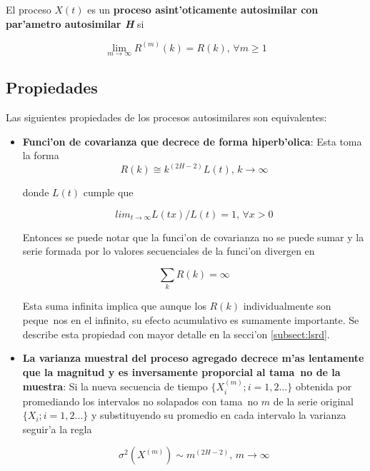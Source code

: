 \begin{definicion} \label{def:aso-autosimilar}
El proceso $X(t)$ es un {\bf proceso asint'oticamente autosimilar con 
par'ametro autosimilar {\it H}} si

\begin{equation} \label{eq:aso-autosimilar}
\lim_{m \to \infty} R^{(m)}(k) = R(k) \text{,  } \forall m \geq 1
\end{equation}
\end{definicion}

\subsection{Propiedades}

Las siguientes propiedades de los procesos autosimilares son equivalentes:

\begin{itemize}
\item {\bf Funci'on de covarianza que decrece de forma hiperb'olica}: Esta toma la forma
\begin{equation}
R(k) \cong k^{(2H-2)}L(t) \text{,  } k \to \infty
\end{equation}

donde $L(t)$ cumple que

\begin{equation}
lim_{t \to \infty} L(tx)/L(t) = 1 \text{,  } \forall x > 0
\end{equation}

Entonces se puede notar que la funci'on de covarianza no se puede sumar y la
serie formada por lo valores secuenciales de la funci'on divergen en

\begin{equation}
\sum_{k}{R(k)} = \infty
\end{equation}

Esta suma infinita implica que aunque los $R(k)$ individualmente son peque~nos
en el infinito, su efecto acumulativo es sumamente importante. Se describe esta
propiedad con mayor detalle en la secci'on \ref{subsect:lsrd}.

\item {\bf La varianza muestral del proceso agregado decrece m'as lentamente
que la magnitud y es inversamente proporcial al tama~no de la muestra}: Si 
la nueva secuencia de tiempo $\{ X_{i}^{(m)} ; i = 1,2 \ldots\}$ obtenida por
promediando los intervalos no solapados con tama~no $m$ de la serie original
$\{ X_i ; i = 1,2 \ldots \}$ y substituyendo su promedio en cada intervalo
la varianza seguir'a la regla

\begin{equation}
\sigma^2(X^{(m)}) \sim m^{(2H-2)} \text{,  } m \to \infty
\end{equation}

\end{itemize}

